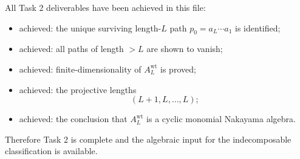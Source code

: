 \documentclass{article}
\theoremstyle{definition}
\begin{document}
All Task 2 deliverables have been achieved in this file:

\begin{itemize}
\item achieved: the unique surviving length-$L$ path
  $p_0=a_L\cdots a_1$ is identified;
\item achieved: all paths of length $>L$ are shown to vanish;
\item achieved: finite-dimensionality of $A_L^{\mathrm{wt}}$ is proved;
\item achieved: the projective lengths
  \[
  (L+1,L,\dots,L);
  \]
\item achieved: the conclusion that $A_L^{\mathrm{wt}}$ is a cyclic monomial
  Nakayama
  algebra.
\end{itemize}

Therefore Task 2 is complete and the algebraic input for the indecomposable
classification is available.
\end{document}
